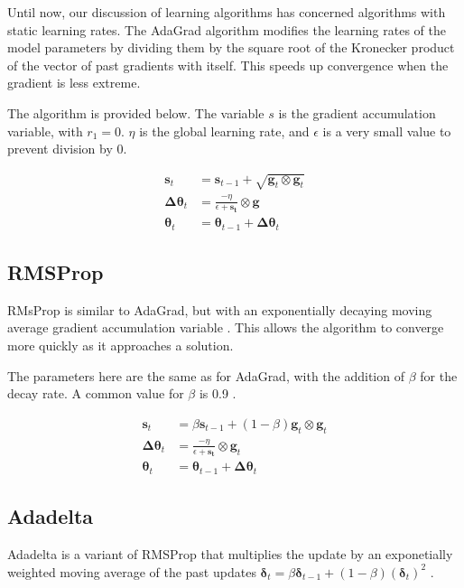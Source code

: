 \documentclass{article}
\begin{document}
Until now, our discussion of learning algorithms has concerned algorithms with static learning rates. The AdaGrad algorithm modifies the learning rates of the model parameters by dividing them by the square root of the Kronecker product of the vector of past gradients with itself. This speeds up convergence when the gradient is less extreme. 

The algorithm is provided below. The variable \(s\) is the gradient accumulation variable, with \(r_1 = 0\). \(\eta\) is the global learning rate, and \(\epsilon\) is a very small value to prevent division by \(0\).

\begin{align*}
    \bm{s}_t &= \bm{s}_{t-1} + \sqrt{\bm{g}_t \otimes \bm{g}_t} \\
    \bm{\Delta \theta}_t &= \frac{-\eta}{\epsilon + \bm{s_t}} \otimes \bm{g} \\
    \bm{\theta}_t &= \bm{\theta}_{t-1} + \bm{\Delta \theta}_t
\end{align*}

\subsection{RMSProp} %

RMsProp is similar to AdaGrad, but with an exponentially decaying moving average gradient accumulation variable \cite{Goodfellow-et-al-2016}. This allows the algorithm to converge more quickly as it approaches a solution.

The parameters here are the same as for AdaGrad, with the addition of \(\beta\) for the decay rate. A common value for \(\beta\) is 0.9 \cite{pml1book}.

\begin{align*}
    \bm{s}_t &= \beta \bm{s}_{t-1} + (1-\beta)\bm{g}_t \otimes \bm{g}_t \\
    \bm{\Delta \theta}_t &= \frac{-\eta}{\epsilon + \bm{s_t}} \otimes \bm{g}_t \\
    \bm{\theta}_t &= \bm{\theta}_{t-1} + \bm{\Delta \theta}_t
\end{align*}

\subsection{Adadelta} %

Adadelta is a variant of RMSProp that multiplies the update by an exponetially weighted moving average of the past updates \(\bm{\delta}_t = \beta \bm{\delta}_{t-1} + (1-\beta)(\bm{\delta}_t)^2\) \cite{pml1book} \cite{zeiler2012}.
\end{document}
